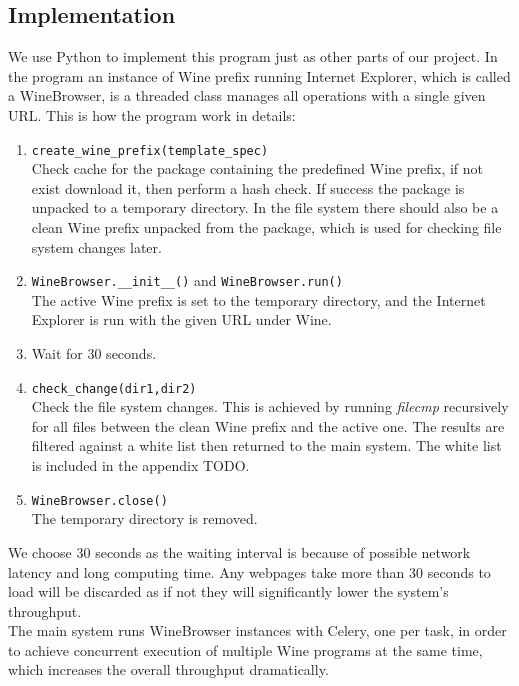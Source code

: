 \subsection{Implementation}
We use Python to implement this program just as other parts of our project. 
In the program an instance of Wine prefix running Internet Explorer, which is called 
a WineBrowser, is a threaded class manages all operations with a single 
given URL. This is how the program work in details:
\begin{enumerate}
\item \verb`create_wine_prefix(template_spec)` \\
Check cache for the package containing the predefined Wine prefix, if not 
exist download it, then perform a hash check.
If success the package is unpacked to a temporary directory. 
In the file system there should also be a clean Wine prefix unpacked from the 
package, which is used for checking file system changes later. 
\item \verb`WineBrowser.__init__()` and \verb`WineBrowser.run()`\\
The active Wine prefix is set to the temporary directory, and the Internet 
Explorer is run with the given URL under Wine. 
\item
Wait for 30 seconds.
\item \verb`check_change(dir1,dir2)`\\
Check the file system changes. This is achieved by running {\em filecmp} recursively 
for all files between the clean Wine prefix and the active one. The results 
are filtered against a white list then returned to the main system. The white 
list is included in the appendix TODO. 
\item \verb`WineBrowser.close()`\\
The temporary directory is removed. 
\end{enumerate}
We choose 30 seconds as the waiting interval is because of possible network 
latency and long computing time. Any webpages take more than 30 seconds to 
load will be discarded as if not they will significantly lower the system's 
throughput. \\
The main system runs WineBrowser instances with Celery, one per task, in order 
to achieve concurrent execution of multiple Wine programs at the same time, 
which increases the overall throughput dramatically. 
